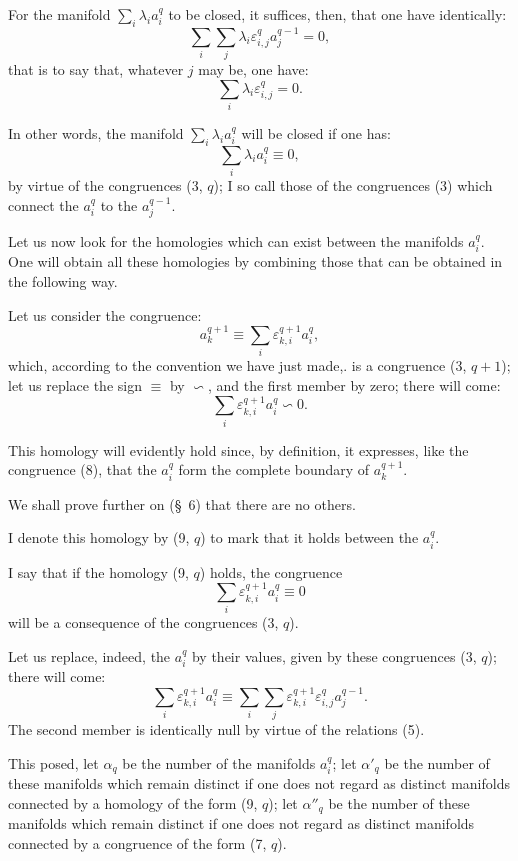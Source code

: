 \documentclass{article}
\begin{document}
For the manifold $\displaystyle\sum_{i} \lambda_{i} a^{q}_{i}$ to be closed, it suffices, then, that one have identically:
\[ \sum_{i} \sum_{j} \lambda_{i} \varepsilon^{q}_{i,j} a^{q-1}_{j} = 0, \]
that is to say that, whatever $j$ may be, one have:
\[ \sum_{i} \lambda_{i} \varepsilon^{q}_{i,j} = 0. \]

In other words, the manifold $\displaystyle\sum_{i} \lambda_{i} a^{q}_{i}$ will be closed if one has:
\[ \sum_{i} \lambda_{i} a^{q}_{i} \equiv 0, \tag{7, $q$} \]
by virtue of the congruences (3, $q$); I so call those of the congruences (3) which connect the $a^{q}_{i}$ to the $a^{q-1}_{j}$.

Let us now look for the homologies which can exist between the manifolds $a^{q}_{i}$. One will obtain all these homologies by combining those that can be obtained in the following way.

Let us consider the congruence:
\[ a^{q+1}_{k} \equiv \sum_{i} \varepsilon^{q+1}_{k,i} a^{q}_{i}, \tag{8} \]
which, according to the convention we have just made,. is a congruence (3, $q + 1$); let us replace the sign $\equiv$ by $\backsim$, and the first member by zero; there will come:
\[ \sum_{i} \varepsilon^{q+1}_{k,i} a^{q}_{i} \backsim 0. \tag{9, $q$} \]

This homology will evidently hold since, by definition, it expresses, like the congruence (8), that the $a^{q}_{i}$ form the complete boundary of $a^{q+1}_{k}$.


We shall prove further on (\S~6) that there are no others.

I denote this homology by (9, $q$) to mark that it holds between the $a^{q}_{i}$.

I say that if the homology (9, $q$) holds, the congruence
\[ \sum_{i} \varepsilon^{q+1}_{k,i} a^{q}_{i} \equiv 0 \tag{10, $q$} \]
will be a consequence of the congruences (3, $q$).

Let us replace, indeed, the $a^{q}_{i}$ by their values, given by these congruences (3, $q$); there will come:
\[ \sum_{i} \varepsilon^{q+1}_{k,i} a^{q}_{i} \equiv \sum_{i} \sum_{j} \varepsilon^{q+1}_{k,i} \varepsilon^{q}_{i,j} a^{q-1}_{j}. \]
The second member is identically null by virtue of the relations (5).

This posed, let $\alpha_{q}$ be the number of the manifolds $a^{q}_{i}$; let $\alpha'_{q}$ be the number of these manifolds which remain distinct if one does not regard as distinct manifolds connected by a homology of the form (9, $q$); let $\alpha''_{q}$ be the number of these manifolds which remain distinct if one does not regard as distinct manifolds connected by a congruence of the form (7, $q$).
\end{document}
